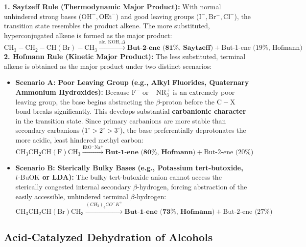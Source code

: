 \documentclass[10pt,a4paper]{article}
\begin{document}
\begin{formulabox}
\textbf{1. Saytzeff Rule (Thermodynamic Major Product):}
With normal unhindered strong bases ($\mathrm{OH^-, OEt^-}$) and good leaving groups ($\mathrm{I^-, Br^-, Cl^-}$), the transition state resembles the product alkene. The more substituted, hyperconjugated alkene is formed as the major product:
\begin{equation}
  \mathrm{CH_3-CH_2-CH(Br)-CH_3} \xrightarrow{\text{alc. } \mathrm{KOH}, \Delta} \textbf{But-2-ene (81\%, Saytzeff)} + \text{But-1-ene (19\%, Hofmann)}
\end{equation}
\textbf{2. Hofmann Rule (Kinetic Major Product):}
The less substituted, terminal alkene is obtained as the major product under two distinct scenarios:
\begin{itemize}
  \item \textbf{Scenario A: Poor Leaving Group (e.g., Alkyl Fluorides, Quaternary Ammonium Hydroxides):}
  Because $\mathrm{F}^-$ or $-\mathrm{NR_3^+}$ is an extremely poor leaving group, the base begins abstracting the $\beta$-proton before the $\mathrm{C-X}$ bond breaks significantly. This develops substantial \textbf{carbanionic character} in the transition state. Since primary carbanions are more stable than secondary carbanions ($1^\circ > 2^\circ > 3^\circ$), the base preferentially deprotonates the more acidic, least hindered methyl carbon:
  \begin{equation}
    \mathrm{CH_3CH_2CH(F)CH_3} \xrightarrow{\mathrm{EtO^-Na^+}} \textbf{But-1-ene (80\%, Hofmann)} + \text{But-2-ene (20\%)}
  \end{equation}
  \item \textbf{Scenario B: Sterically Bulky Bases (e.g., Potassium tert-butoxide, $t\text{-BuOK}$ or LDA):}
  The bulky tert-butoxide anion cannot access the sterically congested internal secondary $\beta$-hydrogen, forcing abstraction of the easily accessible, unhindered terminal $\beta$-hydrogen:
  \begin{equation}
    \mathrm{CH_3CH_2CH(Br)CH_3} \xrightarrow{(CH_3)_3CO^-K^+} \textbf{But-1-ene (73\%, Hofmann)} + \text{But-2-ene (27\%)}
  \end{equation}
\end{itemize}
\end{formulabox}

\subsection{Acid-Catalyzed Dehydration of Alcohols}
\end{document}
